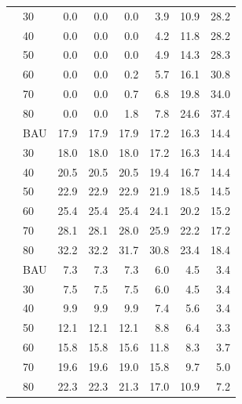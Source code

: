 \documentclass[]{article}
\begin{document}
\begin{longtable}{>{\raggedright\arraybackslash}p{2 cm}lrrrrrr}
\rowcolor{gray!6}   & 30 & 0.0 & 0.0 & 0.0 & 3.9 & 10.9 & 28.2\\

 & 40 & 0.0 & 0.0 & 0.0 & 4.2 & 11.8 & 28.2\\

\rowcolor{gray!6}   & 50 & 0.0 & 0.0 & 0.0 & 4.9 & 14.3 & 28.3\\

 & 60 & 0.0 & 0.0 & 0.2 & 5.7 & 16.1 & 30.8\\

\rowcolor{gray!6}   & 70 & 0.0 & 0.0 & 0.7 & 6.8 & 19.8 & 34.0\\

\multirow{-7}{2 cm}{\raggedright\arraybackslash Offshore Wind} & 80 & 0.0 & 0.0 & 1.8 & 7.8 & 24.6 & 37.4\\
\cmidrule{1-8}
\rowcolor{gray!6}   & BAU & 17.9 & 17.9 & 17.9 & 17.2 & 16.3 & 14.4\\

 & 30 & 18.0 & 18.0 & 18.0 & 17.2 & 16.3 & 14.4\\

\rowcolor{gray!6}   & 40 & 20.5 & 20.5 & 20.5 & 19.4 & 16.7 & 14.4\\

 & 50 & 22.9 & 22.9 & 22.9 & 21.9 & 18.5 & 14.5\\

\rowcolor{gray!6}   & 60 & 25.4 & 25.4 & 25.4 & 24.1 & 20.2 & 15.2\\

 & 70 & 28.1 & 28.1 & 28.0 & 25.9 & 22.2 & 17.2\\

\rowcolor{gray!6}  \multirow{-7}{2 cm}{\raggedright\arraybackslash Solar} & 80 & 32.2 & 32.2 & 31.7 & 30.8 & 23.4 & 18.4\\
\cmidrule{1-8}
 & BAU & 7.3 & 7.3 & 7.3 & 6.0 & 4.5 & 3.4\\

\rowcolor{gray!6}   & 30 & 7.5 & 7.5 & 7.5 & 6.0 & 4.5 & 3.4\\

 & 40 & 9.9 & 9.9 & 9.9 & 7.4 & 5.6 & 3.4\\

\rowcolor{gray!6}   & 50 & 12.1 & 12.1 & 12.1 & 8.8 & 6.4 & 3.3\\

 & 60 & 15.8 & 15.8 & 15.6 & 11.8 & 8.3 & 3.7\\

\rowcolor{gray!6}   & 70 & 19.6 & 19.6 & 19.0 & 15.8 & 9.7 & 5.0\\

\multirow{-7}{2 cm}{\raggedright\arraybackslash Terrestrial Wind} & 80 & 22.3 & 22.3 & 21.3 & 17.0 & 10.9 & 7.2\\
\bottomrule
\end{longtable}
\end{document}
